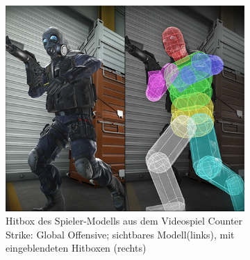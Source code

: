 \begin{figure}
\centering
	\begin{subfigure}[t]{0.45\textwidth}
		\centering
		\includegraphics[width=1\textwidth]{./res/csgo_hitbox.png}
		\caption{Hitbox des Spieler-Modells aus dem Videospiel Counter Strike: Global Offensive; sichtbares Modell(links), mit eingeblendeten Hitboxen (rechts)}
		\label{fig:chitbox}
	\end{subfigure}
~
	\begin{subfigure}[t]{0.2\textwidth}
		\centering

\end{subfigure}
\end{figure}
